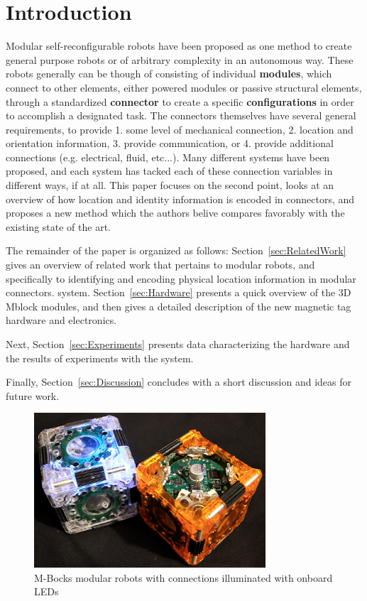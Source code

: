 \section{Introduction}
\label{sec:Introduction}

Modular self-reconfigurable robots have been proposed as one method to create general purpose robots or of arbitrary complexity in an autonomous way. These robots generally can be though of consisting of individual \textbf{modules}, which connect to other elements, either powered modules or passive structural elements, through a standardized \textbf{connector} to create a specific \textbf{configurations} in order to accomplish a designated task. The connectors themselves have several general requirements, to provide 1. some level of mechanical connection, 2. location and orientation information, 3. provide communication, or 4. provide additional connections (e.g. electrical, fluid, etc...). Many different systems have been proposed, and each system has tacked each of these connection variables in different ways, if at all. This paper focuses on the second point, looks at an overview of how location and identity information is encoded in connectors, and proposes a new method which the authors belive compares favorably with the existing state of the art.
	
The remainder of the paper is organized as follows: 
Section~\ref{sec:RelatedWork} gives an overview of related
work that pertains to modular robots, and specifically to identifying and encoding physical location information in modular connectors.
system. 
Section~\ref{sec:Hardware} presents a quick overview of the 3D Mblock modules, and then gives a detailed description of the new magnetic tag hardware and electronics.


Next, Section~\ref{sec:Experiments}
presents data characterizing the hardware and the results of
experiments with the system. 

Finally, Section~\ref{sec:Discussion}
concludes with a short discussion and ideas for future work.

\begin{figure}[htb]  

  \centering
  \includegraphics[width=3.4in]{Figures/cover.png}

  \caption{M-Bocks modular robots with connections illuminated with onboard LEDs}
    
  \label{fig:cover}    
\end{figure}